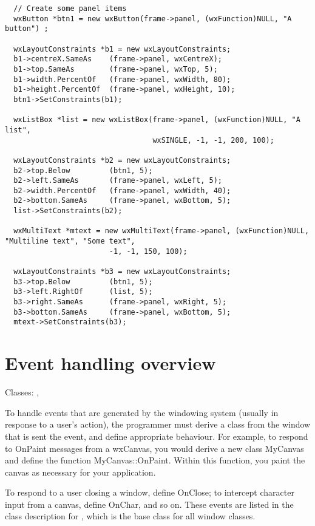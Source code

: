 \begin{verbatim}
  // Create some panel items
  wxButton *btn1 = new wxButton(frame->panel, (wxFunction)NULL, "A button") ;

  wxLayoutConstraints *b1 = new wxLayoutConstraints;
  b1->centreX.SameAs    (frame->panel, wxCentreX);
  b1->top.SameAs        (frame->panel, wxTop, 5);
  b1->width.PercentOf   (frame->panel, wxWidth, 80);
  b1->height.PercentOf  (frame->panel, wxHeight, 10);
  btn1->SetConstraints(b1);

  wxListBox *list = new wxListBox(frame->panel, (wxFunction)NULL, "A list",
                                  wxSINGLE, -1, -1, 200, 100);

  wxLayoutConstraints *b2 = new wxLayoutConstraints;
  b2->top.Below         (btn1, 5);
  b2->left.SameAs       (frame->panel, wxLeft, 5);
  b2->width.PercentOf   (frame->panel, wxWidth, 40);
  b2->bottom.SameAs     (frame->panel, wxBottom, 5);
  list->SetConstraints(b2);

  wxMultiText *mtext = new wxMultiText(frame->panel, (wxFunction)NULL, "Multiline text", "Some text",
                        -1, -1, 150, 100);
  
  wxLayoutConstraints *b3 = new wxLayoutConstraints;
  b3->top.Below         (btn1, 5);
  b3->left.RightOf      (list, 5);
  b3->right.SameAs      (frame->panel, wxRight, 5);
  b3->bottom.SameAs     (frame->panel, wxBottom, 5);
  mtext->SetConstraints(b3);
\end{verbatim}

\section{Event handling overview}\label{eventhandlingoverview}

Classes: , 

To handle events that are generated by the windowing system (usually in response
to a user's action), the programmer must derive a class from the window that
is sent the event, and define appropriate behaviour. For example, to respond to
OnPaint messages from a wxCanvas, you would derive a new class MyCanvas
and define the function MyCanvas::OnPaint. Within this function, you
paint the canvas as necessary for your application.

To respond to a user closing a window, define OnClose; to intercept character
input from a canvas, define OnChar, and so on. These events are listed in the
class description for , which is the
base class for all window classes.


